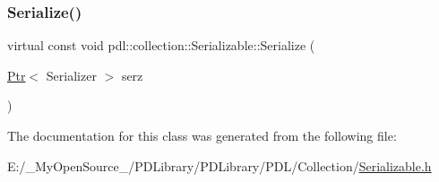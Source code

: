 \mbox{\label{classpdl_1_1collection_1_1_serializable_a2d3f87b827259bf1ab9bd7c9abde5e38}} 
\subsubsection{\texorpdfstring{Serialize()}{Serialize()}}
{\footnotesize\ttfamily virtual const void pdl\+::collection\+::\+Serializable\+::\+Serialize (\begin{DoxyParamCaption}\item[{\mbox{\hyperlink{classpdl_1_1memory_1_1_ptr}{Ptr}}$<$ Serializer $>$}]{serz }\end{DoxyParamCaption})\hspace{0.3cm}{\ttfamily [pure virtual]}}



The documentation for this class was generated from the following file\+:\begin{DoxyCompactItemize}
\item 
E\+:/\+\_\+\+My\+Open\+Source\+\_\+/\+P\+D\+Library/\+P\+D\+Library/\+P\+D\+L/\+Collection/\mbox{\hyperlink{_serializable_8h}{Serializable.\+h}}\end{DoxyCompactItemize}
